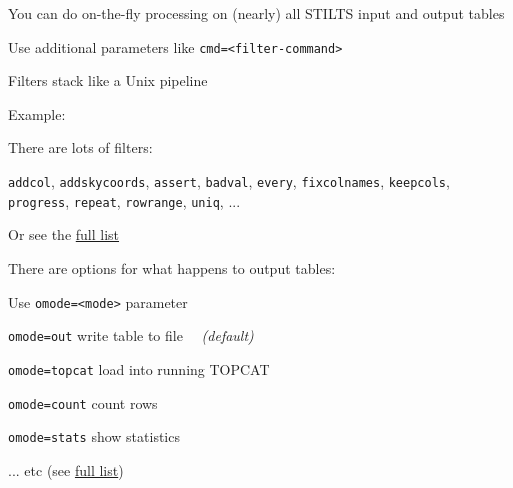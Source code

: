 \documentclass[20pt,landscape]{foils}
\newcommand{\bhref}[2]{\href{#1}{{\color{blue}#2}}}
\begin{document}
\begin{list0}
  \item You can do on-the-fly processing on (nearly) all STILTS input
        and output tables
  \begin{list2big}
    \item Use additional parameters like
          {\color{brown}\verb|cmd=<filter-command>|}
\vspace*{-0.2cm}
    \item Filters stack like a Unix pipeline
\vspace*{-0.2cm}
    \item Example:
    \begin{list3}
       \item[] {\color{grey} }
    \end{list3}
\vspace*{-0.5cm}
    \item There are lots of filters:
\vspace*{-0.2cm}
    \begin{list3}
      \item {\color{brown}\tt addcol},
            {\color{brown}\tt addskycoords},
            {\color{brown}\tt assert},
            {\color{brown}\tt badval},
            {\color{brown}\tt every},
            {\color{brown}\tt fixcolnames},
            {\color{brown}\tt keepcols},
            {\color{brown}\tt progress},
            {\color{brown}\tt repeat},
            {\color{brown}\tt rowrange},
            {\color{brown}\tt uniq},
            ...
      \item Or see the
            \bhref{http://www.starlink.ac.uk/stilts/sun256/filterSteps.html}
                  {full list}
    \end{list3}
  \end{list2big}
\vspace*{-0.2cm}
  \item There are options for what happens to output tables:
\vspace*{-0.2cm}
  \begin{list2big}
    \item Use {\color{brown}\verb|omode=<mode>|} parameter
\vspace*{-0.2cm}
    \begin{list3}
      \item {\color{brown}\tt omode=out} write table to file
            \ \ {\sl (default)}
      \item {\color{brown}\tt omode=topcat} load into running TOPCAT
      \item {\color{brown}\tt omode=count} count rows
      \item {\color{brown}\tt omode=stats} show statistics
      \item[] ... etc (see 
            \bhref{http://www.starlink.ac.uk/stilts/sun256/outModes.html}
                  {full list})
    \end{list3}
  \end{list2big}
\end{list0}
\end{document}
